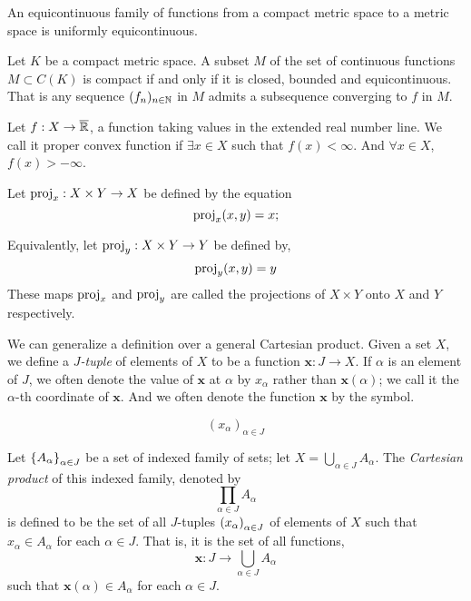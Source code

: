 \begin{theorem}
	An equicontinuous family of functions from a compact metric space to a metric space is uniformly equicontinuous. 
\end{theorem}

\begin{theorem}
	Let $K$ be a compact metric space. A subset $M$ of the set of continuous functions $M\subset C(K)$ is compact if and only if it is closed, bounded and equicontinuous. That is any sequence $(f_n)_{n\in\mathbb{N}}$ in $M$ admits a subsequence converging to $f$ in $M$.
\end{theorem} 


\begin{definition}
	Let $f: X\rightarrow\overline{\mathbb{R}}$, a function taking values in the extended real number line. We call it proper convex function if $\exists x \in X$ such that $f(x)<\infty$. And $\forall x \in X$, $f(x)>-\infty$.
\end{definition}

\begin{definition}
	Let $\mathrm{proj}_x: X\times Y \rightarrow X$ be defined by the equation
	\begin{equation*}
		\mathrm{proj}_x(x,y)= x;
	\end{equation*}
	
	Equivalently, let $\mathrm{proj}_y: X\times Y \rightarrow Y$ be defined by,
	\begin{equation*}
		\mathrm{proj}_y(x,y)=y
	\end{equation*}
	These maps $\mathrm{proj}_x$ and $\mathrm{proj}_y$ are called the projections of $X\times Y$ onto $X$ and $Y$ respectively.	
\end{definition}

We can generalize a definition over a general Cartesian product. Given a set $X$, we define a \textit{$J$-tuple} of elements of $X$ to be a function $\mathbf{x}:J\rightarrow X$. If $\alpha$ is an element of $J$, we often denote the value of $\mathbf{x}$ at $\alpha$ by $x_\alpha$ rather than $\mathbf{x}(\alpha)$; we call it the $\alpha$-th coordinate of $\mathbf{x}$. And we often denote the function $\mathbf{x}$ by the symbol.

\begin{equation*}
	(x_\alpha)_{\alpha \in J}
\end{equation*} 

Let $\left\lbrace A_\alpha \right\rbrace_{\alpha \in J}$ be a set of indexed family of sets; let $X=\bigcup_{\alpha \in J}A_{\alpha}$. The \textit{Cartesian product} of this indexed family, denoted by
\begin{equation*}
	\prod_{\alpha \in J}A_\alpha
\end{equation*}	
is defined to be the set of all $J$-tuples $\left( x_\alpha \right)_{\alpha \in J}$ of elements of $X$ such that $x_\alpha \in A_\alpha$ for each $\alpha \in J$. That is, it is the set of all functions,
\begin{equation*}
\mathbf{x}: J\rightarrow \bigcup_{\alpha \in J} A_\alpha
\end{equation*}
such that $\mathbf{x}(\alpha)\in A_\alpha$ for each $\alpha \in J$.


